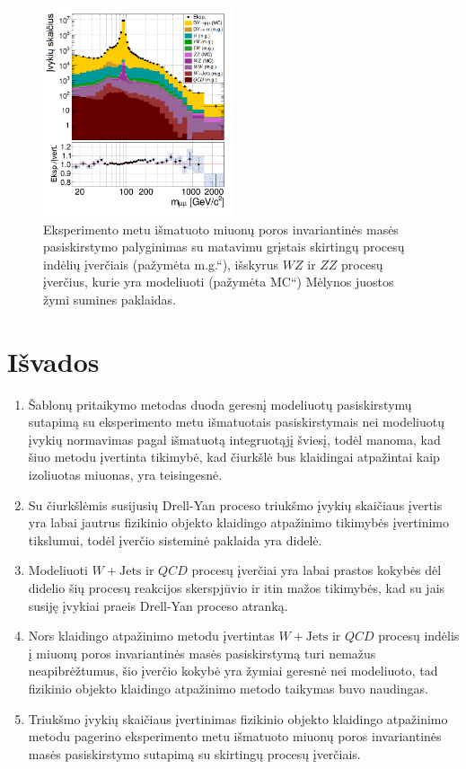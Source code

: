 \documentclass[a4paper, 12pt, oneside]{article}
\newcommand{\ZZ}{Z\! Z}
\newcommand{\WZ}{W\! Z}
\newcommand{\WJets}{W\! +\!\mathrm{Jets}}
\newcommand{\ltq}[1]{{\quotedblbase{}#1\textquotedblleft{}}}
\newcommand{\QCD}{QC\! D}
\newlength\q
\begin{document}
\begin{figure}[H]
	\includegraphics[width=0.5\textwidth]{Kursinis3/Mass_allEst.png}
	\vspace{-0.6cm}
	\caption{\label{fig:MassFinal}
		Eksperimento metu išmatuoto miuonų poros invariantinės masės pasiskirstymo palyginimas su matavimu grįstais
		skirtingų procesų indėlių įverčiais (pažymėta \ltq{m.g.}), išskyrus $\WZ$ ir $\ZZ$ procesų įverčius, kurie
		yra modeliuoti (pažymėta \ltq{MC}) Mėlynos juostos žymi sumines paklaidas.}
\end{figure}


\section{Išvados}
\begin{enumerate}
	\item Šablonų pritaikymo metodas duoda geresnį modeliuotų pasiskirstymų sutapimą su eksperimento metu išmatuotais
	pasiskirstymais nei modeliuotų įvykių normavimas pagal išmatuotą integruotąjį šviesį, todėl manoma, kad šiuo metodu
	įvertinta tikimybė, kad čiurkšlė bus klaidingai atpažintai kaip izoliuotas miuonas, yra teisingesnė.
	\item Su čiurkšlėmis susijusių Drell-Yan proceso triukšmo įvykių skaičiaus įvertis yra labai jautrus
	fizikinio objekto klaidingo atpažinimo tikimybės įvertinimo tikslumui, todėl įverčio sisteminė paklaida yra didelė.
	\item Modeliuoti $\WJets$ ir $\QCD$ procesų įverčiai yra labai prastos kokybės dėl didelio šių procesų reakcijos
	skerspjūvio ir itin mažos tikimybės, kad su jais susiję įvykiai praeis Drell-Yan proceso atranką.
	\item Nors klaidingo atpažinimo metodu įvertintas $\WJets$ ir $\QCD$ procesų indėlis į miuonų poros invariantinės masės
	pasiskirstymą turi nemažus neapibrėžtumus, šio įverčio kokybė yra žymiai geresnė nei modeliuoto, tad fizikinio
	objekto klaidingo atpažinimo metodo taikymas buvo naudingas.
	\item Triukšmo įvykių skaičiaus įvertinimas fizikinio objekto klaidingo atpažinimo metodu pagerino eksperimento
	metu išmatuoto miuonų poros invariantinės masės pasiskirstymo sutapimą su skirtingų procesų įverčiais.
\end{enumerate}
\end{document}
